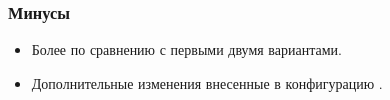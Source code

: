 \subsubsection{Минусы}
\begin{itemize}	
\item Более    по сравнению с первыми двумя вариантами.
\item Дополнительные изменения внесенные в конфигурацию .
\end{itemize}
